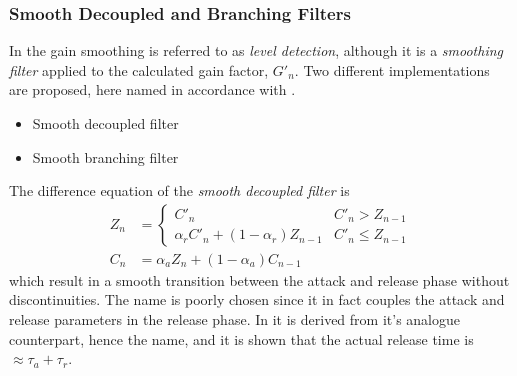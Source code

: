 \documentclass[../main2.tex]{subfiles}
\begin{document}
\subsubsection{Smooth Decoupled and Branching Filters}
In \cite{reiss2012tutorial} the gain smoothing is referred to as \emph{level detection}, although it is a \emph{smoothing filter} applied to the calculated gain factor, $G'_n$. Two different implementations are proposed, here named in accordance with \cite{reiss2012tutorial}.
\begin{itemize}
\item{Smooth decoupled filter}
\item{Smooth branching filter}
\end{itemize}
The difference equation of the \emph{smooth decoupled filter} is
\begin{equation}\label{eq:smooth_decoupled_det}
\begin{split}
Z_n &= \begin{cases}
   C'_n								& C'_n > Z_{n-1} \\
    \alpha_{r} C'_n + (1-\alpha_{r}) Z_{n-1} 	& C'_n \leq Z_{n-1}
\end{cases} \\
C_n &= \alpha_{a} Z_n + (1-\alpha_{a}) C_{n-1}
\end{split}
\end{equation}
which result in a smooth transition between the attack and release phase without discontinuities. The name is poorly chosen since it in fact couples the attack and release parameters in the release phase. In \cite{reiss2012tutorial} it is derived from it's analogue counterpart, hence the name, and it is shown that the actual release time is $\approx \tau_a + \tau_r$.
\end{document}
